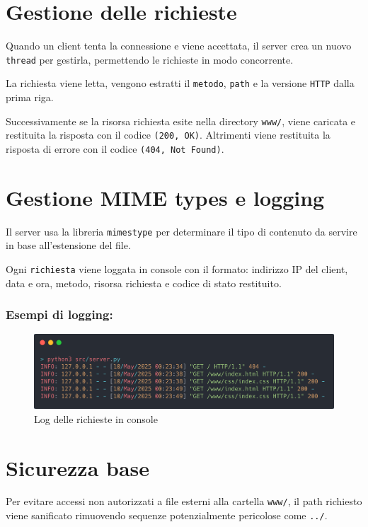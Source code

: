 \documentclass[a4paper,12pt]{report}
\begin{document}
\section{Gestione delle richieste}
Quando un client tenta la connessione e viene accettata, il server crea un nuovo \texttt{thread} per gestirla, permettendo
le richieste in modo concorrente.

La richiesta viene letta, vengono estratti il \texttt{metodo}, \texttt{path} e la versione \texttt{HTTP} dalla prima
riga.

Successivamente se la risorsa richiesta esite nella directory \texttt{www/}, viene caricata e restituita la risposta
con il codice \texttt{(200, OK)}. Altrimenti viene restituita la risposta di errore con il codice \texttt{(404, Not Found)}.

\section{Gestione MIME types e logging}
Il server usa la libreria \texttt{mimestype} per determinare il tipo di contenuto da servire in base all'estensione del
file.

Ogni \texttt{richiesta} viene loggata  in console con il formato: indirizzo IP del client, data e ora, metodo, risorsa richiesta
e codice di stato restituito.

\subsubsection{Esempi di logging:}
\begin{figure}[H]
    \centering
    \includegraphics[width=1\textwidth]{img/logging.png}
    \caption{Log delle richieste in console}
    \label{fig:logging}
\end{figure}

\section{Sicurezza base}

Per evitare accessi non autorizzati a file esterni alla cartella \texttt{www/}, il \newline path richiesto viene sanificato
rimuovendo sequenze potenzialmente pericolose come \texttt{../}.
\end{document}
